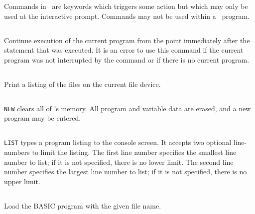\documentclass{report}
\begin{document}
    Commands in \BASIC\ are keywords which triggers some action but which may only be used at the interactive prompt.
    Commands may not be used within a \BASIC\ program.

    \subsection*{}

    Continue execution of the current program from the point immediately after the  statement that was executed.
    It is an error to use this command if the current program was not interrupted by the  command or if there
    is no current program.

    \subsection*{}

    Print a listing of the files on the current file device.

    \subsection*{}

    \verb+NEW+ clears all of \BASIC's memory. All program and variable data are erased, and a new program may be entered.

    \subsection*{}

    \verb+LIST+ types a program listing to the console screen. It accepts two optional line-numbers to limit the listing.
    The first line number specifies the smallest line number to list; if it is not specified, there is no lower limit.
    The second line number specifies the largest line number to list; if it is not specified, there is no upper limit.

    \subsection*{ }

    Load the BASIC program with the given file name.

    \subsection*{ }
\end{document}
